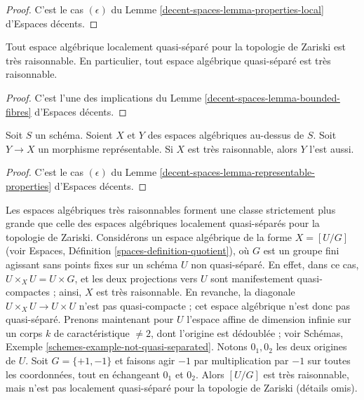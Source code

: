 \begin{proof}
C'est le cas $(\epsilon)$ du
Lemme \ref{decent-spaces-lemma-properties-local} d'Espaces décents.
\end{proof}

\begin{lemma}
\label{lemma-quasi-separated-very-reasonable}
Tout espace algébrique localement quasi-séparé pour la topologie de Zariski est très raisonnable.
En particulier, tout espace algébrique quasi-séparé est très raisonnable.
\end{lemma}

\begin{proof}
C'est l'une des implications du
Lemme \ref{decent-spaces-lemma-bounded-fibres} d'Espaces décents.
\end{proof}

\begin{lemma}
\label{lemma-representable-very-reasonable}
Soit $S$ un schéma.
Soient $X$ et $Y$ des espaces algébriques au-dessus de $S$.
Soit $Y \to X$ un morphisme représentable.
Si $X$ est très raisonnable, alors $Y$ l'est aussi.
\end{lemma}

\begin{proof}
C'est le cas $(\epsilon)$ du
Lemme \ref{decent-spaces-lemma-representable-properties} d'Espaces décents.
\end{proof}

\begin{remark}
\label{remark-very-reasonable-Zariski-locally-quasi-separated}
Les espaces algébriques très raisonnables forment une classe strictement plus
grande que celle des espaces algébriques localement quasi-séparés pour la
topologie de Zariski. Considérons un espace algébrique de la forme
$X = [U/G]$ (voir
Espaces, Définition \ref{spaces-definition-quotient}),
où $G$ est un groupe fini agissant sans points fixes sur un schéma
$U$ non quasi-séparé. En effet, dans ce cas,
$U \times_X U = U \times G$, et les deux projections vers $U$ sont
manifestement quasi-compactes ; ainsi, $X$ est très raisonnable. En revanche,
la diagonale $U \times_X U \to U \times U$ n'est pas quasi-compacte ; cet
espace algébrique n'est donc pas quasi-séparé. Prenons maintenant pour $U$
l'espace affine de dimension infinie sur un corps $k$ de caractéristique
$\not = 2$, dont l'origine est dédoublée ; voir
Schémas, Exemple \ref{schemes-example-not-quasi-separated}.
Notons $0_1, 0_2$ les deux origines de $U$. Soit $G = \{+1, -1\}$ et
faisons agir $-1$ par multiplication par $-1$ sur toutes les coordonnées,
tout en échangeant $0_1$ et $0_2$. Alors $[U/G]$ est très raisonnable, mais
n'est pas localement quasi-séparé pour la topologie de Zariski (détails omis).
\end{remark}

